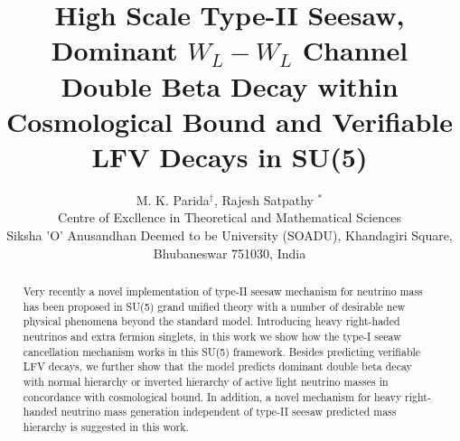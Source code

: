 \documentclass[a4paper,11pt]{article}
\begin{document}

\title{\Large\bf {High Scale Type-II Seesaw, Dominant $W_L-W_L$ Channel Double Beta Decay  within 
Cosmological Bound  and Verifiable LFV Decays in SU(5)}}

\author{M. K. Parida$^{\dagger}$, Rajesh Satpathy $^{*}$\\
Centre of Excllence in Theoretical and Mathematical Sciences\\
Siksha 'O' Anusandhan Deemed to be University (SOADU), Khandagiri
Square,\\
 Bhubaneswar 751030, India}
\maketitle

\begin{abstract}
 Very recently  a novel implementation of type-II seesaw mechanism for
neutrino mass has been proposed in SU(5) grand unified theory with a
number of desirable new physical phenomena beyond the standard model.  
Introducing heavy right-haded neutrinos and extra fermion singlets, in this
work we show how the type-I seeaw cancellation mechanism works in this
SU(5) framework.  Besides predicting verifiable
LFV decays,  we further  show that the model predicts
dominant double beta decay  with normal hierarchy or
inverted hierarchy of active light neutrino masses
in concordance with cosmological bound.  In addition, a novel
mechanism for heavy right-handed neutrino mass generation independent of type-II seesaw
predicted mass hierarchy is suggested in this work.
\end{abstract}
\\
\end{document}
